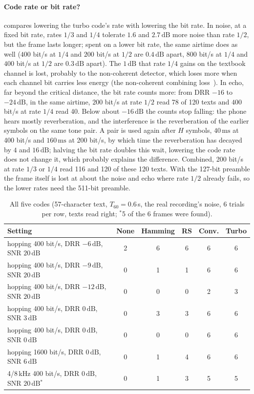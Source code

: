 \documentclass[11pt,a4paper]{article}
\newcommand{\ms}{\,\mathrm{ms}}
\newcommand{\dB}{\,\mathrm{dB}}
\theoremstyle{remark}
\begin{document}
\paragraph{Code rate or bit rate?}
 compares lowering the turbo code's rate with lowering the bit rate. In noise, at a fixed bit rate, rates $1/3$ and $1/4$ tolerate $1.6$ and $2.7\dB$ more noise than rate $1/2$, but the frame lasts longer; spent on a lower bit rate, the same airtime does as well ($400$ bit/s at $1/4$ and $200$ bit/s at $1/2$ are $0.4\dB$ apart, $800$ bit/s at $1/4$ and $400$ bit/s at $1/2$ are $0.3\dB$ apart). The $1\dB$ that rate $1/4$ gains on the textbook channel is lost, probably to the non-coherent detector, which loses more when each channel bit carries less energy (the non-coherent combining loss~\cite{proakis}). In echo, far beyond the critical distance, the bit rate counts more: from DRR $-16$ to $-24\dB$, in the same airtime, $200$ bit/s at rate $1/2$ read 78 of 120 texts and $400$ bit/s at rate $1/4$ read 40. Below about $-16\dB$ the counts stop falling: the phone hears mostly reverberation, and the interference is the reverberation of the earlier symbols on the same tone pair. A pair is used again after $H$ symbols, $40\ms$ at 400 bit/s and $160\ms$ at 200 bit/s, by which time the reverberation has decayed by $4$ and $16\dB$; halving the bit rate doubles this wait, lowering the code rate does not change it, which probably explains the difference. Combined, 200 bit/s at rate $1/3$ or $1/4$ read 116 and 120 of these 120 texts. With the 127-bit preamble the frame itself is lost at about the noise and echo where rate $1/2$ already fails, so the lower rates need the 511-bit preamble.

\begin{table}[ht]
\centering
\caption{All five codes (57-character text, $T_{60} = 0.6$\,s, the real recording's noise, 6 trials per row, texts read right; $^{\ast}$5 of the 6 frames were found).}
\label{tab:rs}
\small
\begin{tabular}{lccccc}
\toprule
Setting & None & Hamming & RS & Conv. & Turbo\\
\midrule
hopping 400 bit/s, DRR $-6\dB$, SNR $20\dB$ & 2 & 6 & 6 & 6 & 6\\
hopping 400 bit/s, DRR $-9\dB$, SNR $20\dB$ & 0 & 1 & 1 & 6 & 6\\
hopping 400 bit/s, DRR $-12\dB$, SNR $20\dB$ & 0 & 0 & 0 & 2 & 3\\
hopping 400 bit/s, DRR $0\dB$, SNR $3\dB$ & 0 & 3 & 3 & 6 & 6\\
hopping 400 bit/s, DRR $0\dB$, SNR $0\dB$ & 0 & 0 & 0 & 6 & 6\\
hopping 1600 bit/s, DRR $0\dB$, SNR $6\dB$ & 0 & 1 & 4 & 6 & 6\\
4/8\,kHz 400 bit/s, DRR $0\dB$, SNR $20\dB$$^{\ast}$ & 0 & 1 & 3 & 5 & 5\\
\bottomrule
\end{tabular}
\end{table}
\end{document}
